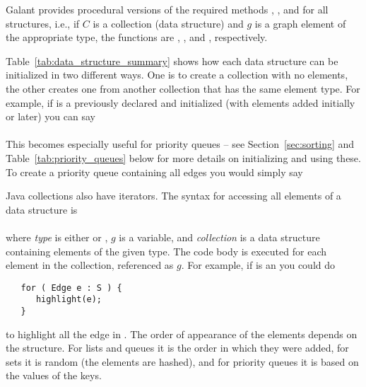 Galant provides procedural versions of the required methods ,
,  and  for all structures, i.e., if $C$
is a collection (data structure) and $g$ is a graph element of the
appropriate type, the functions are , ,
 and , respectively.

Table~\ref{tab:data_structure_summary} shows how each data structure can be
initialized in two different ways. One is to create a collection with no
elements, the other creates one from another collection that has the same
element type. For example, if  is a previously declared and initialized
 (with elements added initially or later) you can say\\
\hspace*{1em}\\
This becomes especially useful for priority queues -- see
Section~\ref{sec:sorting} and Table~\ref{tab:priority_queues} below for more
details on initializing and using these.
To create a priority queue containing all edges you would simply say\\
\hspace*{1em}

Java collections also have iterators. The syntax for accessing all elements
of a data structure is\\
\hspace*{1em}\\
where \emph{type} is either  or , $g$ is a variable,
and \emph{collection} is a data structure containing elements of the given
type. The code body is executed for each element in the collection,
referenced as $g$. For example, if  is an  you could do

\begin{minipage}{\textwidth}
\begin{verbatim}
   for ( Edge e : S ) {
      highlight(e);
   }
\end{verbatim}
\end{minipage}

to highlight all the edge in .
The order of appearance of the elements depends on the structure.
For lists and queues it is the order in which they were added, for sets it is
random (the elements are hashed), and for priority queues it is based on the
values of the keys.

